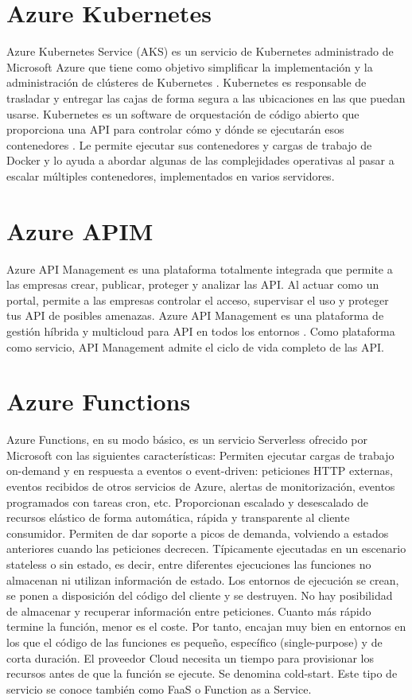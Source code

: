 \section{Azure Kubernetes}
Azure Kubernetes Service (AKS) es un servicio de Kubernetes administrado de Microsoft Azure que tiene como objetivo simplificar la implementación y la administración de clústeres de Kubernetes .
Kubernetes es responsable de trasladar y entregar las cajas de forma segura a las ubicaciones en las que puedan usarse.
Kubernetes es un software de orquestación de código abierto que proporciona una API para controlar cómo y dónde se ejecutarán esos contenedores . Le permite ejecutar sus contenedores y cargas de trabajo de Docker y lo ayuda a abordar algunas de las complejidades operativas al pasar a escalar múltiples contenedores, implementados en varios servidores.
\section{Azure APIM}
Azure API Management es una plataforma totalmente integrada que permite a las empresas crear, publicar, proteger y analizar las API. Al actuar como un portal, permite a las empresas controlar el acceso, supervisar el uso y proteger tus API de posibles amenazas.
Azure API Management es una plataforma de gestión híbrida y multicloud para API en todos los entornos . Como plataforma como servicio, API Management admite el ciclo de vida completo de las API. 
\section{Azure Functions}
Azure Functions, en su modo básico, es un servicio Serverless ofrecido por Microsoft con las siguientes características:
Permiten ejecutar cargas de trabajo on-demand y en respuesta a eventos o event-driven: peticiones HTTP externas, eventos recibidos de otros servicios de Azure, alertas de monitorización, eventos programados con tareas cron, etc.
Proporcionan escalado y desescalado de recursos elástico de forma automática, rápida y transparente al cliente consumidor. Permiten de dar soporte a picos de demanda, volviendo a estados anteriores cuando las peticiones decrecen.
Típicamente ejecutadas en un escenario stateless o sin estado, es decir, entre diferentes ejecuciones las funciones no almacenan ni utilizan información de estado. Los entornos de ejecución se crean, se ponen a disposición del código del cliente y se destruyen. No hay posibilidad de almacenar y recuperar información entre peticiones.
Cuanto más rápido termine la función, menor es el coste. Por tanto, encajan muy bien en entornos en los que el código de las funciones es pequeño, específico (single-purpose) y de corta duración.
El proveedor Cloud necesita un tiempo para provisionar los recursos antes de que la función se ejecute. Se denomina cold-start.
Este tipo de servicio se conoce también como FaaS o Function as a Service.
